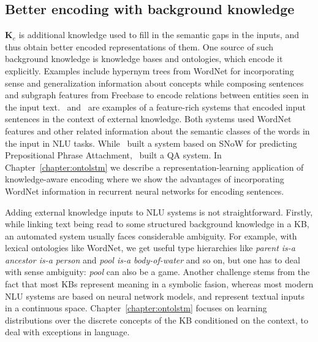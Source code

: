 \subsection{Better encoding with background knowledge} $\mathbf{K}_e$ is additional knowledge used
to fill in the semantic gaps in the inputs, and thus obtain better encoded representations of them.
One source of such background knowledge is knowledge bases and ontologies, which encode it
explicitly. Examples include hypernym trees from WordNet for incorporating sense and generalization
information about concepts while composing sentences and subgraph features from Freebase to encode
relations between entities seen in the input text.~\cite{moldovan2001logic}
and~\cite{krymolowski1998incorporating} are examples of a feature-rich systems that encoded input
sentences in the context of external knowledge. Both systems used WordNet features and other related
information about the semantic classes of the words in the input in NLU tasks.
While~\cite{krymolowski1998incorporating} built a system based on SNoW \citep{CCRR99} for predicting
Prepositional Phrase Attachment,~\cite{moldovan2001logic} built a QA system. In
Chapter~\ref{chapter:ontolstm} we describe a representation-learning application of knowledge-aware
encoding where we show the advantages of incorporating WordNet information in recurrent neural
networks for encoding sentences.

Adding external knowledge inputs to NLU systems is not straightforward. Firstly, while linking text
being read to some structured background knowledge in a KB, an automated system usually faces
considerable ambiguity. For example, with lexical ontologies like WordNet, we get useful type
hierarchies like \textit{parent is-a ancestor is-a person} and \textit{pool is-a body-of-water} and
so on, but one has to deal with sense ambiguity: \textit{pool} can also be a game. Another challenge
stems from the fact that most KBs represent meaning in a symbolic fasion, whereas most modern NLU
systems are based on neural network models, and represent textual inputs in a continuous space.
Chapter~\ref{chapter:ontolstm} focuses on learning distributions over the discrete concepts of the
KB conditioned on the context, to deal with exceptions in language.


